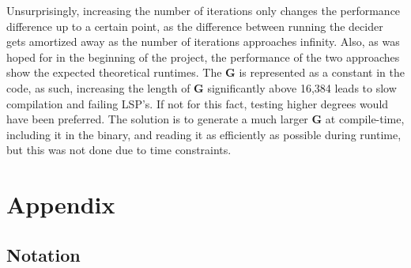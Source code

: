 \documentclass[
]{article}
\renewcommand{\vec}[1]{ \boldsymbol{#1} }
\begin{document}
Unsurprisingly, increasing the number of iterations only changes the
performance difference up to a certain point, as the difference between
running the decider gets amortized away as the number of iterations
approaches infinity. Also, as was hoped for in the beginning of the
project, the performance of the two approaches show the expected
theoretical runtimes. The \(\vec{G}\) is represented as a constant in
the code, as such, increasing the length of \(\vec{G}\) significantly
above 16,384 leads to slow compilation and failing LSP's. If not for
this fact, testing higher degrees would have been preferred. The
solution is to generate a much larger \(\vec{G}\) at compile-time,
including it in the binary, and reading it as efficiently as possible
during runtime, but this was not done due to time constraints.

\newpage

\section{Appendix}\label{appendix}

\subsection{Notation}\label{notation}
\end{document}
